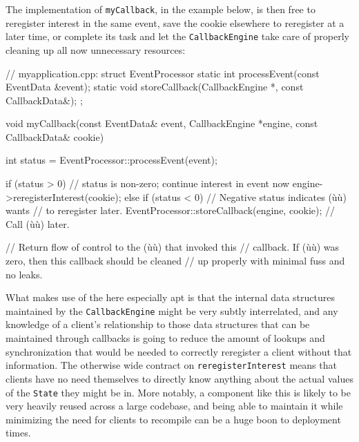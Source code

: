 \noindent The implementation of \lstinline!myCallback!, in the example below, is then
free to reregister interest in the same event, save the cookie elsewhere
to reregister at a later time, or complete its task and let the
\lstinline!CallbackEngine! take care of properly cleaning up all now
unnecessary resources:

\begin{emcppshiddenlisting}[emcppsbatch=e6]
// myapplication.cpp:
struct EventProcessor {
    static int processEvent(const EventData &event);
    static void storeCallback(CallbackEngine *, const CallbackData&);    
};
\end{emcppshiddenlisting}
\begin{emcppslisting}[emcppsbatch=e6,emcppsoutputfile=myapplication.cpp]
void myCallback(const EventData&     event,
                CallbackEngine      *engine,
                const CallbackData&  cookie)
{
    int status = EventProcessor::processEvent(event);

    if (status > 0)  // status is non-zero; continue interest in event now
    {
        engine->reregisterInterest(cookie);
    }
    else if (status < 0)  // Negative status indicates (ù{}ù) wants
                          // to reregister later.
    {
        EventProcessor::storeCallback(engine, cookie);
                          // Call (ù{}ù) later.
    }

    // Return flow of control to the (ù{}ù) that invoked this
    // callback.  If (ù{}ù) was zero, then this callback should be cleaned
    // up properly with minimal fuss and no leaks.
}
\end{emcppslisting}

\noindent What makes use of the  here especially apt is
that the internal data structures maintained by the
\lstinline!CallbackEngine! might be very subtly interrelated, and any
knowledge of a client's relationship to those data structures that can
be maintained through callbacks is going to reduce the amount of lookups
and synchronization that would be needed to correctly reregister a
client without that information. The otherwise wide contract on
\lstinline!reregisterInterest! means that clients have no need themselves
to directly know anything about the actual values of the \lstinline!State!
they might be in. More notably, a component like this is likely to be
very heavily reused across a large codebase, and being able to maintain
it while minimizing the need for clients to recompile can be a huge boon
to deployment times.

